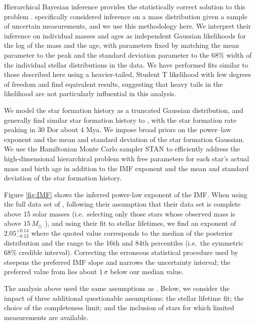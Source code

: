 \documentclass[apjl]{emulateapj}
\newcommand{\onesigrange}[3]{\ensuremath{#1^{+#2}_{-#3}}}
\newcommand{\alpharangeone}{\onesigrange{2.05}{0.14}{0.12}}
\begin{document}
Hierarchical Bayesian inference provides the statistically correct solution to
this problem \citep{Hogg:2010}.  \citet{Mandel:2010stat} specifically considered
inference on a mass distribution given a sample of uncertain measurements, and
we use this methodology here.  We interpret their inference
on individual masses and ages as independent Gaussian likelihoods for the log
of the mass and the age, with parameters fixed by matching the mean parameter to the peak and the standard deviation parameter to the 68\% width of the
individual stellar distributions in the \citet{Schneider:2018} data.  We have performed fits similar to those described here using a heavier-tailed, Student T likelihood with few degrees of freedom and find equivalent results, suggesting that heavy tails in the likelihood are not particularly influential in this analysis.

We model the star formation history as a truncated Gaussian distribution, and
generally find similar star formation history to \citet{Schneider:2018}, with
the star formation rate peaking in 30 Dor about 4 Mya.  We impose broad priors
on the power--law exponent and the mean and standard deviation of the star
formation Gaussian.    We use the Hamiltonian Monte Carlo sampler STAN
\citep{STAN} to efficiently address the high-dimensional hierarchical problem
with free parameters for each star's actual mass and birth age in addition to
the IMF exponent and the mean and standard deviation of the star formation
history.

Figure \ref{fig:IMF} shows the inferred power-law exponent of the IMF.   When
using the full data set of \citet{Schneider:2018}, following their assumption
that their data set is complete above 15 solar masses (i.e.\ selecting only
those stars whose observed mass is above $15 \, M_\odot$
\citep{Loredo:2004,BBH:O1}), and using their fit to stellar lifetimes, we find
an exponent of $\alpharangeone$ where the quoted value corresponds to the median
of the posterior distribution and the range to the 16th and 84th percentiles
(i.e.\ the symmetric 68\% credible interval).  Correcting the erroneous
statistical procedure used by \citet{Schneider:2018} steepens the preferred IMF
slope and narrows the uncertainty interval; the preferred value from
\citet{Schneider:2018} lies about $1\, \sigma$ below our median value.

The analysis above used the same assumptions as \citet{Schneider:2018}.  Below, we consider the impact of three additional questionable assumptions: the stellar lifetime fit; the choice of the completeness limit; and the inclusion of stars for which limited measurements are available.
\end{document}
